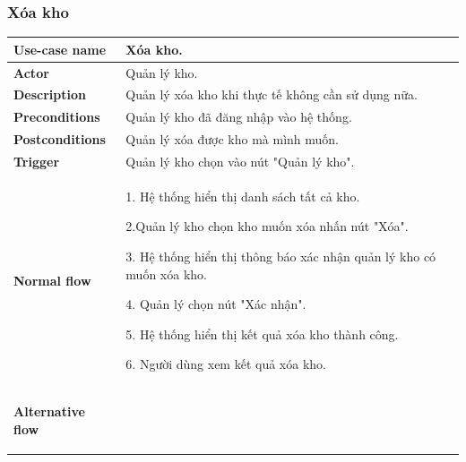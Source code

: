         \subsubsection{Xóa kho}
            \begin{longtable}{| p{} | p{} |} 
                \hline
                 \textbf{Use-case name} 
                & 
                Xóa kho.
                \\
                \hline
                \textbf{Actor} 
                & 
                Quản lý kho.
                \\
                \hline
                \textbf{Description} 
                & 
                Quản lý xóa kho khi thực tế không cần sử dụng nữa.
                \\
                \hline
                 \textbf{Preconditions} 
                &
                Quản lý kho đã đăng nhập vào hệ thống.
                \\
                \hline
                \textbf{Postconditions} 
                & 
                Quản lý xóa được kho mà mình muốn.
                \\
                \hline
                \textbf{Trigger} 
                & 
                Quản lý kho chọn vào nút "Quản lý kho".
                \\
                \hline
                \begin{flushleft}
                 \textbf{Normal flow}
                \end{flushleft}
                & 
                1. Hệ thống hiển thị danh sách tất cả kho.
                    
                    2.Quản lý kho chọn kho muốn xóa nhấn nút "Xóa".
                    
                    3. Hệ thống hiển thị thông báo xác nhận quản lý kho có muốn xóa kho.
                    
                    4. Quản lý chọn nút "Xác nhận".
                    
                    5. Hệ thống hiển thị kết quả xóa kho thành công.
                    
                    6. Người dùng xem kết quả xóa kho.
                \\
                \hline
                \begin{flushleft}
                    \textbf{Alternative flow}
                    

\end{flushleft}
\end{longtable}
